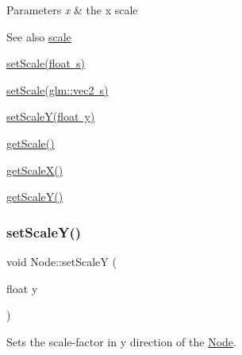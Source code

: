 \begin{DoxyParams}{Parameters}
{\em x} & the x scale \\
\hline
\end{DoxyParams}
\begin{DoxySeeAlso}{See also}
\mbox{\hyperlink{classsage_1_1Node_a3014b585d97d3a449e83bc0252db0c50}{scale}} 

\mbox{\hyperlink{classsage_1_1Node_a939698b2eb68ee5b60b91e2426e95369}{set\+Scale(float s)}} 

\mbox{\hyperlink{classsage_1_1Node_aecff30b003ce1c2266cc60a34b72559d}{set\+Scale(glm\+::vec2 s)}} 

\mbox{\hyperlink{classsage_1_1Node_afa22161545d63e9e011f8eeb5acdead7}{set\+Scale\+Y(float y)}} 

\mbox{\hyperlink{classsage_1_1Node_af1a9bc0715acbc80623b5a15a5f65f3f}{get\+Scale()}} 

\mbox{\hyperlink{classsage_1_1Node_a27040ef8ab59ccf42b87d6ddc8d794e6}{get\+Scale\+X()}} 

\mbox{\hyperlink{classsage_1_1Node_ab87661ab8940512baf2e7639ea55ff87}{get\+Scale\+Y()}} 
\end{DoxySeeAlso}
\mbox{\label{classsage_1_1Node_afa22161545d63e9e011f8eeb5acdead7}} 
\subsubsection{\texorpdfstring{setScaleY()}{setScaleY()}}
{\footnotesize\ttfamily void Node\+::set\+ScaleY (\begin{DoxyParamCaption}\item[{float}]{y }\end{DoxyParamCaption})}



Sets the scale-\/factor in y direction of the \mbox{\hyperlink{classsage_1_1Node}{Node}}. 


